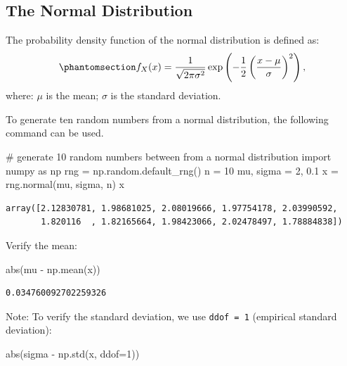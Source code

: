 \documentclass[
  letterpaper,
  DIV=11,
  numbers=noendperiod]{scrreprt}
\newenvironment{Shaded}{\begin{snugshade}}{\end{snugshade}}
\newcommand{\BuiltInTok}[1]{\textcolor[rgb]{0.00,0.23,0.31}{#1}}
\newcommand{\CommentTok}[1]{\textcolor[rgb]{0.37,0.37,0.37}{#1}}
\newcommand{\DecValTok}[1]{\textcolor[rgb]{0.68,0.00,0.00}{#1}}
\newcommand{\FloatTok}[1]{\textcolor[rgb]{0.68,0.00,0.00}{#1}}
\newcommand{\ImportTok}[1]{\textcolor[rgb]{0.00,0.46,0.62}{#1}}
\newcommand{\NormalTok}[1]{\textcolor[rgb]{0.00,0.23,0.31}{#1}}
\newcommand{\OperatorTok}[1]{\textcolor[rgb]{0.37,0.37,0.37}{#1}}
\begin{document}
\subsection{The Normal Distribution}\label{the-normal-distribution}

The probability density function of the normal distribution is defined
as: \begin{equation}\phantomsection\label{eq-normal-one}{
f_X(x) = \frac{1}{\sqrt{2\pi \sigma^2}} \exp\left(-\frac{1}{2} \left(\frac{x-\mu}{\sigma}\right)^2\right),
}\end{equation} where: \(\mu\) is the mean; \(\sigma\) is the standard
deviation.

To generate ten random numbers from a normal distribution, the following
command can be used.

\begin{Shaded}
\begin{Highlighting}[]
\CommentTok{\# generate 10 random numbers between from a normal distribution}
\ImportTok{import}\NormalTok{ numpy }\ImportTok{as}\NormalTok{ np}
\NormalTok{rng }\OperatorTok{=}\NormalTok{ np.random.default\_rng()}
\NormalTok{n }\OperatorTok{=} \DecValTok{10}
\NormalTok{mu, sigma }\OperatorTok{=} \DecValTok{2}\NormalTok{, }\FloatTok{0.1}
\NormalTok{x }\OperatorTok{=}\NormalTok{ rng.normal(mu, sigma, n)}
\NormalTok{x}
\end{Highlighting}
\end{Shaded}

\begin{verbatim}
array([2.12830781, 1.98681025, 2.08019666, 1.97754178, 2.03990592,
       1.820116  , 1.82165664, 1.98423066, 2.02478497, 1.78884838])
\end{verbatim}

Verify the mean:

\begin{Shaded}
\begin{Highlighting}[]
\BuiltInTok{abs}\NormalTok{(mu }\OperatorTok{{-}}\NormalTok{ np.mean(x))}
\end{Highlighting}
\end{Shaded}

\begin{verbatim}
0.034760092702259326
\end{verbatim}

Note: To verify the standard deviation, we use \texttt{ddof\ =\ 1}
(empirical standard deviation):

\begin{Shaded}
\begin{Highlighting}[]
\BuiltInTok{abs}\NormalTok{(sigma }\OperatorTok{{-}}\NormalTok{ np.std(x, ddof}\OperatorTok{=}\DecValTok{1}\NormalTok{))}
\end{Highlighting}
\end{Shaded}
\end{document}
